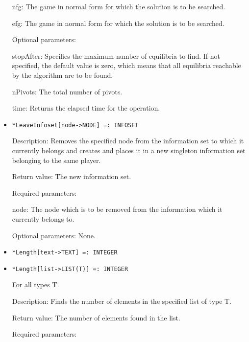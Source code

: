 \begin{itemize}
\bd
\item
[nfg:] The game in normal form for which the solution is to be
searched.
\item
[efg:] The game in normal form for which the solution is to be
searched.
\ed

\item
[Optional parameters:]\hfil\null

\bd
\item
[stopAfter:] Specifies the maximum number of equilibria to find.  If
not specified, the default value is zero, which means that all
equilibria reachable by the algorithm are to be found.
\item
[nPivots:] The total number of pivots. 
\item
[time:] Returns the elapsed time for the operation.
\ed
\ed

\item
\protect \large \begin{verbatim}
*LeaveInfoset[node->NODE] =: INFOSET
\end{verbatim}\normalsize

\bd
\item
[Description:] Removes the specified node from the information set to
which it currently belongs and creates and places it in a new
singleton information set belonging to the same player.
\item
[Return value:] The new information set.
\item
[Required parameters:]\hfil\null
	  
\bd
\item
[node:] The node which is to be removed from the information which it
currently belongs to.
\ed

\item
[Optional parameters:] None.
\ed

\item
\protect \large \begin{verbatim}
*Length[text->TEXT] =: INTEGER
\end{verbatim}\normalsize

\item
\protect \large \begin{verbatim}
*Length[list->LIST(T)] =: INTEGER
\end{verbatim}\normalsize
For all types T.

\bd
\item
[Description:] Finds the number of elements in the specified list of
type T.
\item
[Return value:] The number of elements found in the list.
\item
[Required parameters:]\hfil\null


\end{itemize}
